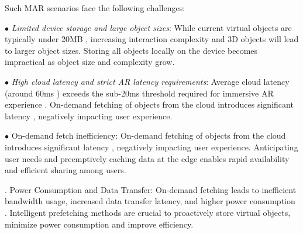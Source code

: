     Such MAR scenarios face the following challenges:
    
    \noindent$\bullet$ {\em Limited device storage and large object sizes}:  While current virtual objects are typically under 20MB \cite{bib:carsar, bib:objaverse}, increasing interaction complexity and 3D objects will lead to larger object sizes.  Storing all objects locally on the device  becomes impractical as object size and complexity grow.
    
    \noindent$\bullet$ {\em High cloud latency and strict AR latency requirements}: Average cloud latency (around 60ms \cite{bib:clatency, bib:clt1, bib:clt2}) exceeds the sub-20ms threshold required for immersive AR experience \cite{bib:20ms}.  On-demand fetching of objects from the cloud introduces significant latency \cite{bib:delayhits}, negatively impacting user experience.  
    
        \noindent$\bullet$ On-demand fetch inefficiency: On-demand fetching of objects from the cloud introduces significant latency \cite{bib:delayhits}, negatively impacting user experience.  Anticipating user needs and preemptively caching data at the edge enables rapid availability and efficient sharing among users.

    
    . Power Consumption and Data Transfer:  On-demand fetching leads to inefficient bandwidth usage, increased data transfer latency, and higher power consumption \cite{bib:energy}.  Intelligent prefetching methods are crucial to proactively store virtual objects, minimize power consumption and improve efficiency.
    \fi

    

